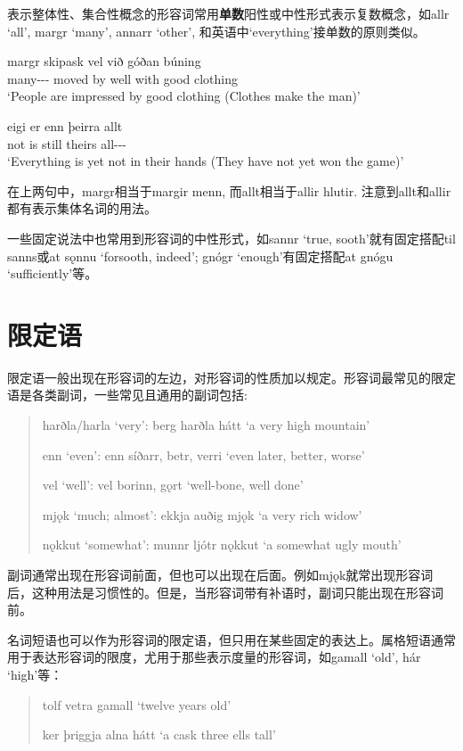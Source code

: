 表示整体性、集合性概念的形容词常用\textbf{单数}阳性或中性形式表示复数概念，如allr `all', margr `many', annarr `other', 和英语中`everything'接单数的原则类似。
\begin{exe}
    \ex \gll
    margr skipask vel við góðan búning\\
    many-{\nom}-{\mas}-{\sing} {moved by} well with good clothing\\
    \trans `People are impressed by good clothing (Clothes make the man)'

    \ex \gll
    eigi er enn þeirra allt\\
    not is still theirs all-{\nom}-{\neu}-{\sing}\\
    \trans `Everything is yet not in their hands (They have not yet won the game)'
\end{exe}

在上两句中，margr相当于margir menn, 而allt相当于allir hlutir. 注意到allt和allir都有表示集体名词的用法。

一些固定说法中也常用到形容词的中性形式，如sannr `true, sooth'就有固定搭配til sanns或at sǫnnu `forsooth, indeed'; gnógr `enough'有固定搭配at gnógu `sufficiently'等。

\section{限定语}
限定语一般出现在形容词的左边，对形容词的性质加以规定。形容词最常见的限定语是各类副词，一些常见且通用的副词包括:
\begin{quote}
    harðla/harla `very': berg harðla hátt `a very high mountain'

    enn `even': enn síðarr, betr, verri `even later, better, worse'

    vel `well': vel borinn, gǫrt `well-bone, well done'

    mjǫk `much; almost': ekkja auðig mjǫk `a very rich widow'

    nǫkkut `somewhat': munnr ljótr nǫkkut `a somewhat ugly mouth'
\end{quote}

副词通常出现在形容词前面，但也可以出现在后面。例如mjǫk就常出现形容词后，这种用法是习惯性的。但是，当形容词带有补语时，副词只能出现在形容词前。

名词短语也可以作为形容词的限定语，但只用在某些固定的表达上。属格短语通常用于表达形容词的限度，尤用于那些表示度量的形容词，如gamall `old', hár `high'等：
\begin{quote}
    tolf vetra gamall `twelve years old'

    ker þriggja alna hátt `a cask three ells tall'
\end{quote}

